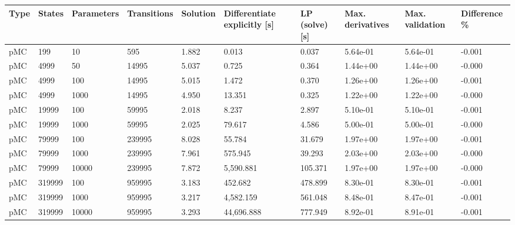\begin{tabular}{llllllllll}
\toprule
Type & States & Parameters & Transitions &  Solution & Differentiate explicitly [s] & LP (solve) [s] & Max. derivatives & Max. validation & Difference \% \\
\midrule
 pMC &    199 &         10 &         595 &     1.882 &                        0.013 &          0.037 &         5.64e-01 &        5.64e-01 &       -0.001 \\
 pMC &   4999 &         50 &       14995 &     5.037 &                        0.725 &          0.364 &         1.44e+00 &        1.44e+00 &       -0.000 \\
 pMC &   4999 &        100 &       14995 &     5.015 &                        1.472 &          0.370 &         1.26e+00 &        1.26e+00 &       -0.001 \\
 pMC &   4999 &       1000 &       14995 &     4.950 &                       13.351 &          0.325 &         1.22e+00 &        1.22e+00 &       -0.000 \\
 pMC &  19999 &        100 &       59995 &     2.018 &                        8.237 &          2.897 &         5.10e-01 &        5.10e-01 &       -0.001 \\
 pMC &  19999 &       1000 &       59995 &     2.025 &                       79.617 &          4.586 &         5.00e-01 &        5.00e-01 &       -0.000 \\
 pMC &  79999 &        100 &      239995 &     8.028 &                       55.784 &         31.679 &         1.97e+00 &        1.97e+00 &       -0.001 \\
 pMC &  79999 &       1000 &      239995 &     7.961 &                      575.945 &         39.293 &         2.03e+00 &        2.03e+00 &       -0.000 \\
 pMC &  79999 &      10000 &      239995 &     7.872 &                    5,590.881 &        105.371 &         1.97e+00 &        1.97e+00 &       -0.000 \\
 pMC & 319999 &        100 &      959995 &     3.183 &                      452.682 &        478.899 &         8.30e-01 &        8.30e-01 &       -0.001 \\
 pMC & 319999 &       1000 &      959995 &     3.217 &                    4,582.159 &        561.048 &         8.48e-01 &        8.47e-01 &       -0.001 \\
 pMC & 319999 &      10000 &      959995 &     3.293 &                   44,696.888 &        777.949 &         8.92e-01 &        8.91e-01 &       -0.001 \\

\end{tabular}
